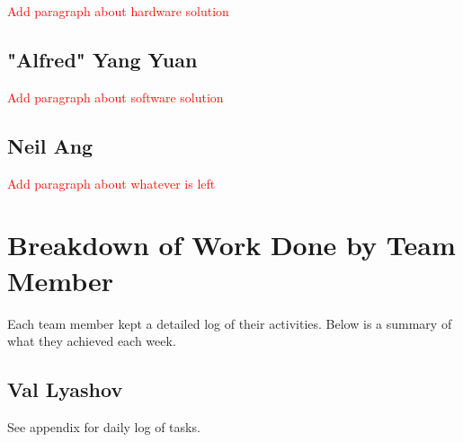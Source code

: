 \documentclass[11pt,a4paper,titlepage]{report}
\begin{document}
\textcolor{red}{Add paragraph about hardware solution}

\subsection{"Alfred" Yang Yuan}

\textcolor{red}{Add paragraph about software solution}

\subsection{Neil Ang}

\textcolor{red}{Add paragraph about whatever is left}


\section{Breakdown of Work Done by Team Member}

Each team member kept a detailed log of their activities. Below is a summary of what they achieved each week.

\subsection{Val Lyashov}

See appendix for daily log of tasks.
\end{document}
